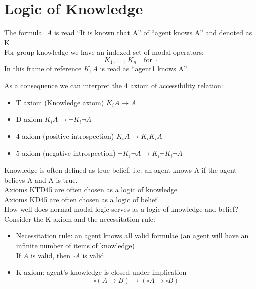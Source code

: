 \section{Logic of Knowledge}

The formula $\square A$ is read ``It is known that A'' of ``agent knows A'' and denoted as K\\
For group knowledge we have an indexed set of modal operators:
\[K_1, ...., K_n \quad\text{for }\square\]
In this frame of reference $K_1 A$ is read as ``agent1 knows A''

As a consequence we can interpret the 4 axiom of accessibility relation:
\begin{itemize}
\item T axiom (Knowledge axiom) $K_i A \rightarrow A$\\
\item D axiom $K_i A \rightarrow \neg{K_i} \neg{A}$\\
\item 4 axiom (positive introspection) $K_i A \rightarrow K_i K_i A$\\
\item 5 axiom (negative introspection) $\neg{K_i} \neg{A}\rightarrow K_i \neg{K_i}\neg{A}$\\
\end{itemize}

Knowledge is often defined as true belief, i.e. an agent knows A if the agent believs A and A is true.\\
Axioms KTD45 are often chosen as a logic of knowledge\\
Axioms KD45 are often chosen as a logic of belief\\

How well does normal modal logic serves as a logic of knowledge and belief?\\
Consider the K axiom and the necessitation rule:
\begin{itemize}
\item Necessitation rule: an agent knows all valid formulae (an agent will have an infinite number of items of knowledge)\\
If $A$ is valid, then $\square A$ is valid
\item K axiom: agent's knowledge is closed under implication
\[\square(A\rightarrow B) \rightarrow (\square A \rightarrow \square B)\]
\end{itemize}

